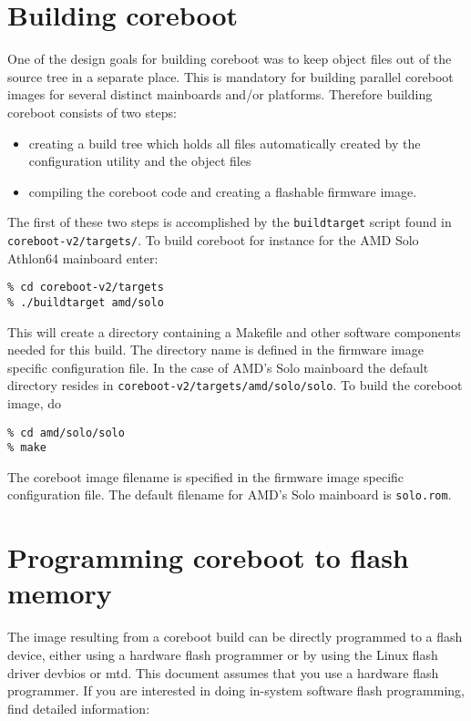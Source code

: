 \documentclass[titlepage,12pt]{article}
\begin{document}
\section{Building coreboot}
One of the design goals for building coreboot was to keep object files
out of the source tree in a separate place. This is mandatory for
building parallel coreboot images for several distinct mainboards
and/or platforms. Therefore building coreboot consists of two steps:
\begin{itemize}
\item
creating a build tree which holds all files automatically created by the
configuration utility and the object files
\item
compiling the coreboot code and creating a flashable firmware image.
\end{itemize}

The first of these two steps is accomplished by the \texttt{buildtarget}
script found in \texttt{coreboot-v2/targets/}. To build coreboot for
instance for the AMD Solo Athlon64 mainboard enter:

\begin{verbatim}
% cd coreboot-v2/targets
% ./buildtarget amd/solo
\end{verbatim}

This will create a directory containing a Makefile and other software
components needed for this build. The directory name is defined in the
firmware image specific configuration file. In the case of AMD's Solo
mainboard the default directory resides in 
\texttt{coreboot-v2/targets/amd/solo/solo}. To build the coreboot image, do

\begin{verbatim}
% cd amd/solo/solo
% make
\end{verbatim}

The coreboot image filename is specified in the firmware image specific
configuration file. The default filename for AMD's Solo mainboard is
\texttt{solo.rom}.

%
%

\section{Programming coreboot to flash memory}
The image resulting from a coreboot build can be directly programmed to
a flash device, either using a hardware flash programmer or by using the
Linux flash driver devbios or mtd. This document assumes that you use a
hardware flash programmer. If you are interested in doing in-system
software flash programming, find detailed information:
\end{document}
